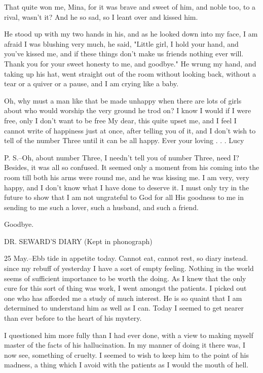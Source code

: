 That quite won me, Mina, for it was brave and sweet of him, and noble too, to a rival, wasn't it? And he so sad, so I leant over and kissed him. 

He stood up with my two hands in his, and as he looked down into my face, I am afraid I was blushing very much, he said, "Little girl, I hold your hand, and you've kissed me, and if these things don't make us friends nothing ever will. Thank you for your sweet honesty to me, and goodbye." He wrung my hand, and taking up his hat, went straight out of the room without looking back, without a tear or a quiver or a pause, and I am crying like a baby. 

Oh, why must a man like that be made unhappy when there are lots of girls about who would worship the very ground he trod on? I know I would if I were free, only I don't want to be free My dear, this quite upset me, and I feel I cannot write of happiness just at once, after telling you of it, and I don't wish to tell of the number Three until it can be all happy. Ever your loving . . . Lucy 

P. S.--Oh, about number Three, I needn't tell you of number Three, need I? Besides, it was all so confused. It seemed only a moment from his coming into the room till both his arms were round me, and he was kissing me. I am very, very happy, and I don't know what I have done to deserve it. I must only try in the future to show that I am not ungrateful to God for all His goodness to me in sending to me such a lover, such a husband, and such a friend. 

Goodbye. 

DR. SEWARD'S DIARY (Kept in phonograph) 

25 May.--Ebb tide in appetite today. Cannot eat, cannot rest, so diary instead. since my rebuff of yesterday I have a sort of empty feeling. Nothing in the world seems of sufficient importance to be worth the doing. As I knew that the only cure for this sort of thing was work, I went amongst the patients. I picked out one who has afforded me a study of much interest. He is so quaint that I am determined to understand him as well as I can. Today I seemed to get nearer than ever before to the heart of his mystery. 

I questioned him more fully than I had ever done, with a view to making myself master of the facts of his hallucination. In my manner of doing it there was, I now see, something of cruelty. I seemed to wish to keep him to the point of his madness, a thing which I avoid with the patients as I would the mouth of hell. 

